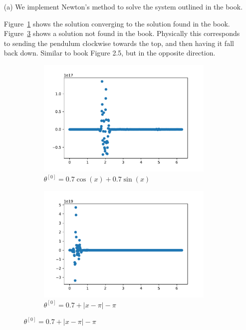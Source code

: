 \documentclass[10pt]{article}
\begin{document}
\begin{solution}[Solution]

\begin{enumerate}
    \item[(a)] 
        We implement Newton's method to solve the system outlined in the book. 
        

        Figure~\ref{original} shows the solution converging to the solution found in the book. Figure~\ref{abs} shows a solution not found in the book. Physically this corresponds to sending the pendulum clockwise towards the top, and then having it fall back down. Similar to book Figure 2.5, but in the opposite direction.
        \begin{figure}[H]\centering
            \begin{subfigure}{.45\textwidth}
                \includegraphics[width=\textwidth]{img/1/original.pdf}
                \caption{\( \theta^{[0]} = 0.7\cos(x) + 0.7\sin(x) \)}
                \label{original}
            \end{subfigure}
            \begin{subfigure}{.45\textwidth}
                \includegraphics[width=\textwidth]{img/1/abs.pdf}
                \caption{\( \theta^{[0]} = 0.7 + |x-\pi| -\pi \)}
                \label{abs}
            \end{subfigure}
       \end{figure}


\end{enumerate}
\end{solution}
\end{document}
